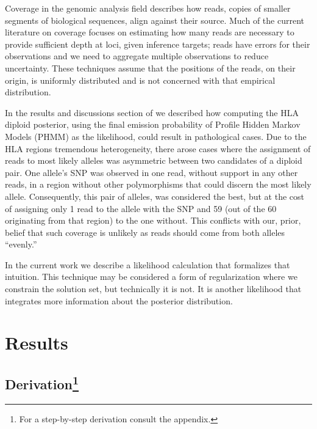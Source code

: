 Coverage in the genomic analysis field describes how reads,
copies of smaller segments of biological sequences,
align against their source.
Much of the current literature on coverage focuses on
estimating how many reads are necessary to provide sufficient depth at loci,
given inference targets\cite{Wendl2008};
reads have errors for their observations and we need to aggregate multiple
observations to reduce uncertainty.
These techniques assume that the positions of the reads,
on their origin,
is uniformly distributed and is not concerned with that empirical distribution.

In the results and discussions section of \cite{Prohlatype} we described how
computing the HLA diploid posterior,
using the final emission probability of Profile Hidden Markov Models (PHMM)
as the likelihood,
could result in pathological cases.
Due to the HLA regions tremendous heterogeneity,
there arose cases where the assignment of reads to most likely alleles was
asymmetric between two candidates of a diploid pair.
One allele's SNP was observed in one read,
without support in any other reads,
in a region without other polymorphisms
that could discern the most likely allele.
Consequently, this pair of alleles,
was considered the best, but at the cost of
assigning only 1 read to the allele with the SNP
and 59 (out of the 60 originating from that region) to the one without.
This conflicts with our, prior, belief that such coverage is unlikely
as reads should come from both alleles ``evenly.'' 

In the current work we describe a likelihood calculation that formalizes that
intuition.
This technique may be considered a form of regularization\cite{TODO} where we
constrain the solution set, but technically it is not.
It is another likelihood that integrates more information about the posterior
distribution.

\section{Results}

\subsection[Derivation]{Derivation\footnote{For a step-by-step derivation consult the appendix.}}

